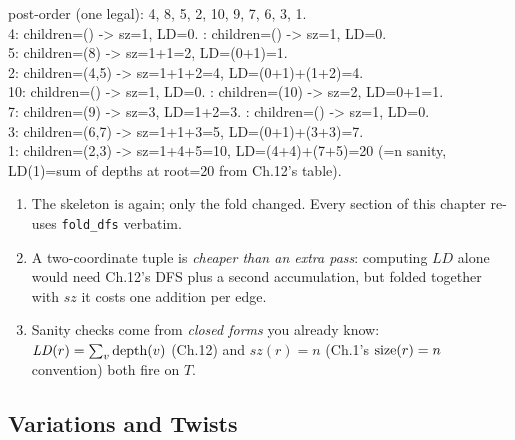 \begin{tracebox}
post-order (one legal): 4, 8, 5, 2, 10, 9, 7, 6, 3, 1.\\
4: children=() -> sz=1, LD=0. \;: children=() -> sz=1, LD=0.\\
5: children=(8) -> sz=1+1=2, LD=(0+1)=1.\\
2: children=(4,5) -> sz=1+1+2=4, LD=(0+1)+(1+2)=4.\\
10: children=() -> sz=1, LD=0. \;: children=(10) -> sz=2, LD=0+1=1.\\
7: children=(9) -> sz=3, LD=1+2=3. \;: children=() -> sz=1, LD=0.\\
3: children=(6,7) -> sz=1+1+3=5, LD=(0+1)+(3+3)=7.\\
1: children=(2,3) -> sz=1+4+5=10, LD=(4+4)+(7+5)=20 \checkmark (=n sanity,
LD(1)=sum of depths at root=20 from Ch.12's table). \checkmark
\end{tracebox}

\begin{insightbox}
\begin{enumerate}[nosep, leftmargin=1.6em]
  \item The skeleton is  again; only the fold changed.
        Every section of this chapter re-uses \lstinline{fold_dfs} verbatim.
  \item A two-coordinate tuple is \emph{cheaper than an extra pass}: computing
        $\mathit{LD}$ alone would need Ch.12's DFS plus a second accumulation,
        but folded together with $\mathit{sz}$ it costs one addition per edge.
  \item Sanity checks come from \emph{closed forms} you already know:
        $\mathit{LD}(r)=\sum_v\operatorname{depth}(v)$ (Ch.12) and $\mathit{sz}(r)=n$
        (Ch.1's $\operatorname{size}(r)=n$ convention) both fire on $T$.
\end{enumerate}
\end{insightbox}

\subsection{Variations and Twists}

